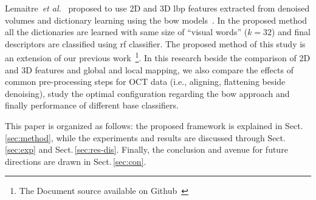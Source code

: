 Lemaitre~\emph{et al.}~\cite{Lemaintre2015miccaiOCT} proposed to use 2D and 3D \ac{lbp} features extracted from denoised volumes and dictionary learning using the \ac{bow} models~\cite{Sivic2003}.
In the proposed method all the dictionaries are learned with same size of ``visual words'' ($k = 32$) and final descriptors are classified using \ac{rf} classifier.
The proposed method of this study is an extension of our previous work~\cite{Lemaintre2015miccaiOCT}\footnote{The Document source available on Github~\cite{Lemaitre2015}}.
In this research beside the comparison of 2D and 3D features and global and local mapping, we also compare the effects of common pre-processing steps for OCT data (i.e., aligning, flattening beside denoising), study the optimal configuration regarding the \ac{bow} approach and finally performance of different base classifiers.
 
 
This paper is organized as follows: the proposed framework is explained in Sect.\,\ref{sec:method}, while the experiments and results are discussed through Sect.\,\ref{sec:exp} and Sect.\,\ref{sec:res-dis}.
Finally, the conclusion and avenue for future directions are drawn in Sect.\,\ref{sec:con}.


